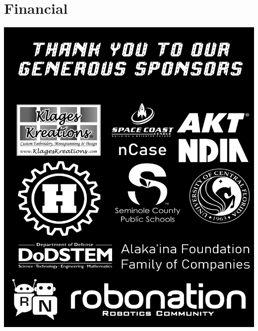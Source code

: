 \documentclass[
letterpaper, %
11pt, %
twoside,
onecolumn, %
openright, %
]{report}
\begin{document}
\cleardoublepage                                                                                                                                        

                                            
\chapter{Financial}
\vspace{3em}
\begin{minipage}[c]{\linewidth}
\centering
\includegraphics[width=\linewidth]{Images/Main/League Shirt Sponsors Draft 1}
\end{minipage}


\end{document}
